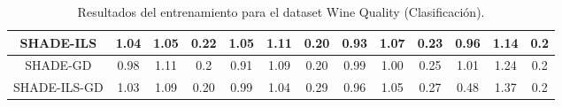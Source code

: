 \begin{table}[H]
{\begin{tabular}{|c|ccc|ccc|ccc|ccc|}
SHADE-ILS                                            & \multicolumn{1}{c|}{1.04}          & \multicolumn{1}{c|}{1.05}          & 0.22          & \multicolumn{1}{c|}{1.05}          & \multicolumn{1}{c|}{1.11}          & 0.20          & \multicolumn{1}{c|}{0.93}          & \multicolumn{1}{c|}{1.07}          & 0.23          & \multicolumn{1}{c|}{0.96}          & \multicolumn{1}{c|}{1.14}          & 0.2           \\ \hline
SHADE-GD                                             & \multicolumn{1}{c|}{0.98}          & \multicolumn{1}{c|}{1.11}          & 0.2           & \multicolumn{1}{c|}{0.91}          & \multicolumn{1}{c|}{1.09}          & 0.20          & \multicolumn{1}{c|}{0.99}          & \multicolumn{1}{c|}{1.00}          & 0.25          & \multicolumn{1}{c|}{1.01}          & \multicolumn{1}{c|}{1.24}          & 0.2           \\ \hline
SHADE-ILS-GD                                         & \multicolumn{1}{c|}{1.03}          & \multicolumn{1}{c|}{1.09}          & 0.20          & \multicolumn{1}{c|}{0.99}          & \multicolumn{1}{c|}{1.04}          & 0.29          & \multicolumn{1}{c|}{0.96}          & \multicolumn{1}{c|}{1.05}          & 0.27          & \multicolumn{1}{c|}{0.48}          & \multicolumn{1}{c|}{1.37}          & 0.2           \\ \hline
\end{tabular}}
\caption{Resultados del entrenamiento para el dataset Wine Quality (Clasificación).}
\label{tab:wqr}
\end{table}




